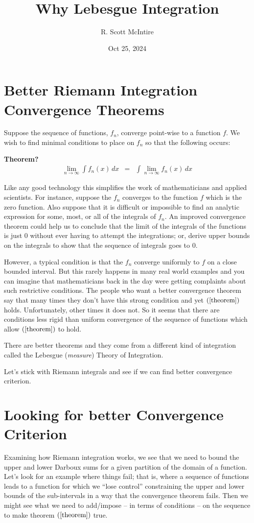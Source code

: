 \documentclass{article}
\title{Why Lebesgue Integration}
\author{R. Scott McIntire}
\date{Oct 25, 2024}
\begin{document}
\maketitle


\section{Better Riemann Integration Convergence Theorems}
Suppose the sequence of functions, $f_n$, converge point-wise to a function $f$.
We wish to find minimal conditions to place on $f_n$ so that the following occurs:

{\bf Theorem?}
\begin{eqnarray}
	\lim_{n \rightarrow \infty}\limits \int f_n(x) \, dx & = & \int \lim_{n \rightarrow \infty}\limits f_n(x) \, dx \label{theorem}
\end{eqnarray}

Like any good technology this simplifies the work of mathematicians 
and applied scientists. For instance, suppose the $f_n$ converges to the function $f$ 
which is the zero function. Also suppose that it is difficult or impossible to 
find an analytic expression for some, most, or all of the integrals of $f_n$. 
An improved convergence theorem could help us to conclude that the limit of the integrals of 
the functions is just $0$ without ever having to attempt the integrations; or, 
derive upper bounds on the integrals to show that 
the sequence of integrals goes to $0$.

However, a typical condition is that the $f_n$ converge 
uniformly to $f$ on a close bounded interval. 
But this rarely happens in many real world examples and you can imagine that
mathematicians back in the day
were getting complaints about such restrictive 
conditions. The people who want a better convergence theorem say that many 
times they don't have this strong condition and yet $(\ref{theorem})$
holds. Unfortunately, other times it does not. So it seems that there are 
conditions less rigid than uniform convergence of the sequence of 
functions which allow $(\ref{theorem})$ to hold.

There are better theorems and they come from a different kind of integration called 
the Lebesgue ({\em measure\/}) Theory of Integration.

Let's stick with Riemann integrals and see if we can find better convergence 
criterion.

\section{Looking for better Convergence Criterion}
Examining how Riemann integration works, we see that we need to bound the upper 
and lower Darboux sums for a given partition of the domain of a function. 
Let's look for an example where things fail; that is, where 
a sequence of functions leads to a function for which we ``lose control'' 
constraining the upper and lower bounds of the sub-intervals in a way that the 
convergence theorem fails. Then we might see what we need to add/impose 
-- in terms of conditions -- on the sequence to make theorem 
$(\ref{theorem})$ true.
\end{document}

